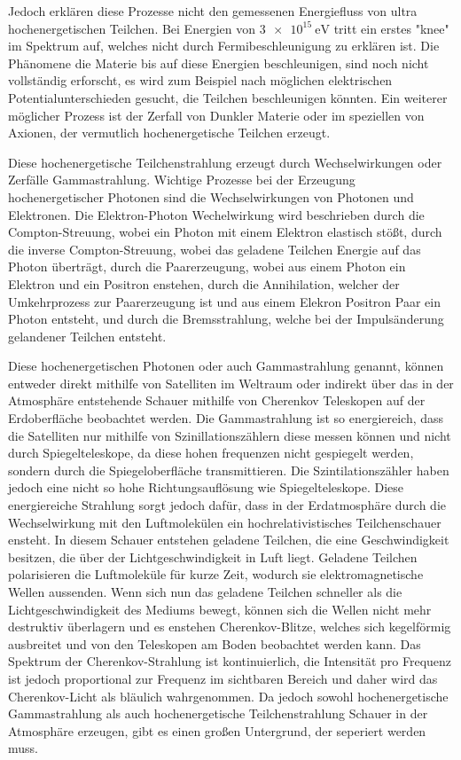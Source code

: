 Jedoch erklären diese Prozesse nicht den gemessenen Energiefluss von ultra hochenergetischen Teilchen. Bei Energien von $\SI{3e15}{\eV}$ tritt ein erstes
"knee" im Spektrum auf, welches nicht durch Fermibeschleunigung zu erklären ist.
Die Phänomene die Materie bis auf diese Energien beschleunigen, sind noch nicht vollständig erforscht, es wird zum Beispiel nach möglichen elektrischen
Potentialunterschieden gesucht, die Teilchen beschleunigen könnten.
Ein weiterer möglicher Prozess ist der Zerfall von Dunkler Materie oder im speziellen von Axionen, der vermutlich hochenergetische Teilchen erzeugt.

Diese hochenergetische Teilchenstrahlung erzeugt durch Wechselwirkungen oder Zerfälle Gammastrahlung.
Wichtige Prozesse bei der Erzeugung hochenergetischer Photonen sind die Wechselwirkungen von Photonen und Elektronen.
Die Elektron-Photon Wechelwirkung wird beschrieben durch die
Compton-Streuung, wobei ein Photon mit einem Elektron elastisch stößt, durch die inverse Compton-Streuung, wobei das geladene Teilchen Energie auf das Photon
überträgt, durch die Paarerzeugung, wobei aus einem Photon ein Elektron
und ein Positron enstehen, durch die Annihilation, welcher der Umkehrprozess zur Paarerzeugung ist und aus einem Elekron Positron Paar
ein Photon entsteht, und durch die Bremsstrahlung, welche bei der Impulsänderung gelandener Teilchen entsteht.

Diese hochenergetischen Photonen oder auch Gammastrahlung genannt, können entweder direkt mithilfe von Satelliten im Weltraum oder indirekt über das in
der Atmosphäre entstehende Schauer mithilfe von Cherenkov Teleskopen auf der Erdoberfläche beobachtet werden.
Die Gammastrahlung ist so energiereich, dass die Satelliten nur mithilfe von Szinillationszählern diese messen können und nicht durch Spiegelteleskope,
da diese hohen frequenzen nicht gespiegelt werden, sondern durch die Spiegeloberfläche transmittieren. Die Szintilationszähler haben jedoch eine nicht
so hohe Richtungsauflösung wie Spiegelteleskope.
Diese energiereiche Strahlung sorgt jedoch dafür, dass in der Erdatmosphäre durch die Wechselwirkung mit den Luftmolekülen ein hochrelativistisches
Teilchenschauer ensteht.
In diesem Schauer entstehen geladene Teilchen, die eine Geschwindigkeit besitzen, die über der Lichtgeschwindigkeit in Luft liegt.
Geladene Teilchen polarisieren die Luftmoleküle für kurze Zeit, wodurch sie elektromagnetische Wellen aussenden.
Wenn sich nun das geladene Teilchen schneller als die Lichtgeschwindigkeit des Mediums bewegt, können sich die Wellen nicht mehr destruktiv
überlagern und es enstehen Cherenkov-Blitze, welches sich kegelförmig ausbreitet und von den Teleskopen am Boden beobachtet werden kann.
Das Spektrum der Cherenkov-Strahlung ist kontinuierlich, die Intensität pro Frequenz ist jedoch proportional zur Frequenz im sichtbaren Bereich und
daher wird das Cherenkov-Licht als bläulich wahrgenommen. Da jedoch sowohl hochenergetische Gammastrahlung als auch hochenergetische Teilchenstrahlung
Schauer in der Atmosphäre erzeugen, gibt es einen großen Untergrund, der seperiert werden muss.

